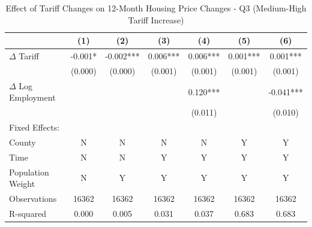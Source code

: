 \begin{table}[htbp]
\centering
\caption{Effect of Tariff Changes on 12-Month Housing Price Changes - Q3 (Medium-High Tariff Increase)}
\label{tab:tariffs_changes_q3}
\begin{tabular}{lcccccc}
\toprule
{} &       (1) &      (2) &       (3) &       (4) &       (5) &        (6) \\
\midrule
$\Delta$ Tariff  &    -0.001* & -0.002*** &  0.006*** &  0.006*** &  0.001*** &   0.001*** \\
                 &    (0.000) &   (0.000) &   (0.001) &   (0.001) &   (0.001) &    (0.001) \\
$\Delta$ Log Employment &           &           &           &  0.120*** &           &  -0.041*** \\
                 &           &           &           &   (0.011) &           &    (0.010) \\
Fixed Effects:   &           &          &           &           &           &            \\
County           &         N &        N &         N &         N &         Y &          Y \\
Time             &         N &        N &         Y &         Y &         Y &          Y \\
Population Weight &        N &        Y &         Y &         Y &         Y &          Y \\
\midrule
Observations     &     16362 &     16362 &     16362 &     16362 &     16362 &      16362 \\
R-squared        &     0.000 &     0.005 &     0.031 &     0.037 &     0.683 &      0.683 \\
\bottomrule
\end{tabular}
\end{table}